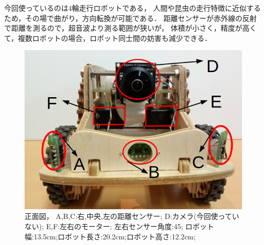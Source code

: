 今回使っているのは4輪走行ロボットである，
人間や昆虫の走行特徴に近似するため，その場で曲がり，方向転換が可能である．
距離センサーが赤外線の反射で距離を測るので，超音波より測る範囲が狭いが，
体積が小さく，精度が高くて，複数ロボットの場合，ロボット同士間の妨害も減少できる．
\vspace{-2mm}
\begin{figure}[h]
        \centering
        \includegraphics[width=0.6\linewidth]{robot1.jpg}
        \caption{正面図， A,B,C:右,中央,左の距離センサー;
                 D:カメラ(今回使っていない);
                 E,F:左右のモーター;
                 左右センサー角度:45\degree;
                 ロボット幅:13.5cm;ロボット長さ:20.2cm;ロボット高さ:12.2cm;
        }
\end{figure}



